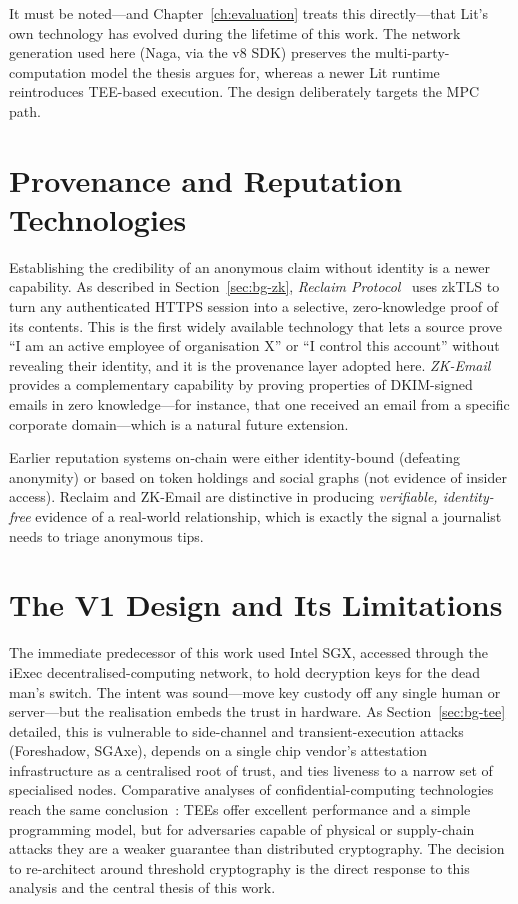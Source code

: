 It must be noted---and Chapter~\ref{ch:evaluation} treats this directly---that
Lit's own technology has evolved during the lifetime of this work. The network
generation used here (Naga, via the v8 SDK) preserves the multi-party-computation
model the thesis argues for, whereas a newer Lit runtime reintroduces TEE-based
execution. The design deliberately targets the MPC path.

\section{Provenance and Reputation Technologies}
\label{sec:rel-provenance}

Establishing the credibility of an anonymous claim without identity is a newer
capability. As described in Section~\ref{sec:bg-zk}, \emph{Reclaim
Protocol}~\cite{reclaim} uses zkTLS to turn any authenticated HTTPS session into a
selective, zero-knowledge proof of its contents. This is the first widely
available technology that lets a source prove ``I am an active employee of
organisation X'' or ``I control this account'' without revealing their identity,
and it is the provenance layer adopted here. \emph{ZK-Email}~\cite{zkemail}
provides a complementary capability by proving properties of DKIM-signed emails in
zero knowledge---for instance, that one received an email from a specific
corporate domain---which is a natural future extension.

Earlier reputation systems on-chain were either identity-bound (defeating
anonymity) or based on token holdings and social graphs (not evidence of
insider access). Reclaim and ZK-Email are distinctive in producing
\emph{verifiable, identity-free} evidence of a real-world relationship, which is
exactly the signal a journalist needs to triage anonymous tips.

\section{The V1 Design and Its Limitations}
\label{sec:rel-v1}

The immediate predecessor of this work used Intel SGX, accessed through the iExec
decentralised-computing network, to hold decryption keys for the dead man's
switch. The intent was sound---move key custody off any single human or
server---but the realisation embeds the trust in hardware. As
Section~\ref{sec:bg-tee} detailed, this is vulnerable to side-channel and
transient-execution attacks (Foreshadow, SGAxe), depends on a single chip
vendor's attestation infrastructure as a centralised root of trust, and ties
liveness to a narrow set of specialised nodes. Comparative analyses of
confidential-computing technologies reach the same
conclusion~\cite{phalaTeeMpc}: TEEs offer excellent performance and a simple
programming model, but for adversaries capable of physical or supply-chain
attacks they are a weaker guarantee than distributed cryptography. The decision to
re-architect around threshold cryptography is the direct response to this
analysis and the central thesis of this work.

